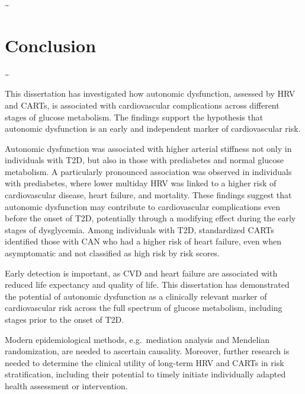 \documentclass[
  a4paper,
  headsepline=true,
  open=any]{scrbook}
\begin{document}
\newpage

\thispagestyle{empty}

\textasciitilde{} \newpage


\hypertarget{conclusion}{%
\chapter{Conclusion}\label{conclusion}}

\newpage

\thispagestyle{empty}

\textasciitilde{} \newpage

This dissertation has investigated how autonomic dysfunction, assessed
by HRV and CARTs, is associated with cardiovascular complications across
different stages of glucose metabolism. The findings support the
hypothesis that autonomic dysfunction is an early and independent marker
of cardiovascular risk.

Autonomic dysfunction was associated with higher arterial stiffness not
only in individuals with T2D, but also in those with prediabetes and
normal glucose metabolism. A particularly pronounced association was
observed in individuals with prediabetes, where lower multiday HRV was
linked to a higher risk of cardiovascular disease, heart failure, and
mortality. These findings suggest that autonomic dysfunction may
contribute to cardiovascular complications even before the onset of T2D,
potentially through a modifying effect during the early stages of
dysglycemia. Among individuals with T2D, standardized CARTs identified
those with CAN who had a higher risk of heart failure, even when
asymptomatic and not classified as high risk by risk scores.

Early detection is important, as CVD and heart failure are associated
with reduced life expectancy and quality of life. This dissertation has
demonstrated the potential of autonomic dysfunction as a clinically
relevant marker of cardiovascular risk across the full spectrum of
glucose metabolism, including stages prior to the onset of T2D.

Modern epidemiological methods, e.g.~mediation analysis and Mendelian
randomization, are needed to ascertain causality. Moreover, further
research is needed to determine the clinical utility of long-term HRV
and CARTs in risk stratification, including their potential to timely
initiate individually adapted health assessment or intervention.
\end{document}
